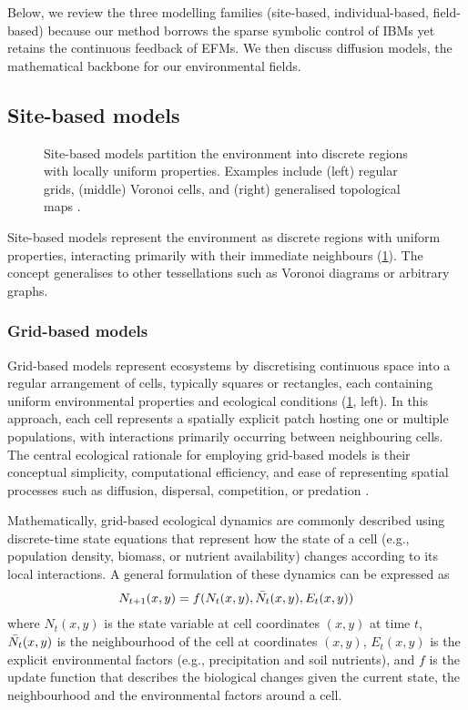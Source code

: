 Below, we review the three modelling families (site-based, individual-based, field-based) because our method borrows the sparse symbolic control of IBMs yet retains the continuous feedback of EFMs. We then discuss diffusion models, the mathematical backbone for our environmental fields.

\subsection{Site-based models}

\begin{figure}
    \caption{Site-based models partition the environment into discrete regions with locally uniform properties. Examples include (left) regular grids, (middle) Voronoi cells, and (right) generalised topological maps \cite{Nelson2012,Lemiere2023}.}
    \label{fig:env-obj-grid-based-models}
\end{figure}

Site-based models represent the environment as discrete regions with uniform properties, interacting primarily with their immediate neighbours (\cref{fig:env-obj-grid-based-models}). The concept generalises to other tessellations such as Voronoi diagrams or arbitrary graphs.

\subsubsection{Grid-based models}

Grid-based models represent ecosystems by discretising continuous space into a regular arrangement of cells, typically squares or rectangles, each containing uniform environmental properties and ecological conditions (\cref{fig:env-obj-grid-based-models}, left). In this approach, each cell represents a spatially explicit patch hosting one or multiple populations, with interactions primarily occurring between neighbouring cells. The central ecological rationale for employing grid-based models is their conceptual simplicity, computational efficiency, and ease of representing spatial processes such as diffusion, dispersal, competition, or predation \cite{Grimm2005,Cantrell2010,Nelson2012}.

Mathematically, grid-based ecological dynamics are commonly described using discrete-time state equations that represent how the state of a cell (e.g., population density, biomass, or nutrient availability) changes according to its local interactions. A general formulation of these dynamics can be expressed as
\begin{align}
    N_{t+1}(x,y) = f(N_t(x,y), \Bar{N_t}(x, y), E_t(x, y))
\end{align}
where $N_t(x, y)$ is the state variable at cell coordinates $(x, y)$ at time $t$, $\Bar{N_t}(x, y)$ is the neighbourhood of the cell at coordinates $(x, y)$, $E_t(x, y)$ is the explicit environmental factors (e.g., precipitation and soil nutrients), and $f$ is the update function that describes the biological changes given the current state, the neighbourhood and the environmental factors around a cell.

